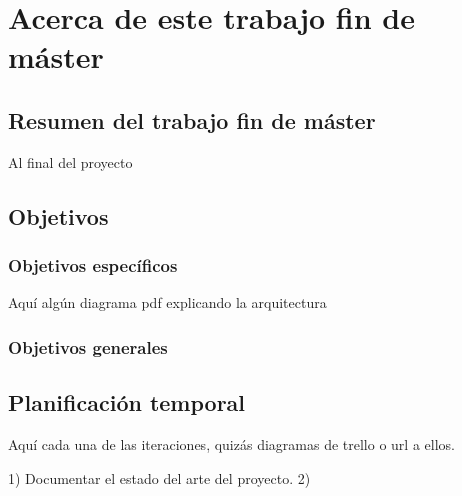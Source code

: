 \chapter{Acerca de este trabajo fin de máster}
\label{cha:introduction}


\section{Resumen del trabajo fin de máster}

Al final del proyecto

\section{Objetivos}

\subsection{Objetivos específicos}

Aquí algún diagrama pdf explicando la arquitectura

\subsection{Objetivos generales}

\section{Planificación temporal}

Aquí cada una de las iteraciones, quizás diagramas de trello o url a ellos.

1) Documentar el estado del arte del proyecto.
2)
